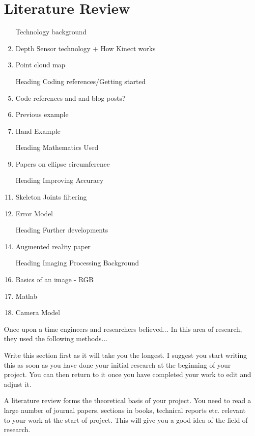 \chapter{Literature Review}

\begin{enumerate}
	\item [Technology background] 
	\item Depth Sensor technology + How Kinect works
	\item Point cloud map
	
	\item [Heading] Coding references/Getting started
	\item Code references and and blog posts? 
	\item Previous example
	\item Hand Example
	
	\item [Heading] Mathematics Used
	\item Papers on ellipse circumference
	
	\item [Heading] Improving Accuracy
	\item Skeleton Joints filtering
	\item Error Model
	
	\item [Heading] Further developments
	\item Augmented reality paper
	
	\item [Heading] Imaging Processing Background
	\item Basics of an image - RGB
	\item Matlab
	\item Camera Model
\end{enumerate}

Once upon a time engineers and researchers believed... In this area of research, they used the following methods... \cite{jct2010}

Write this section first as it will take you the longest. I suggest you start writing this as soon as you
have done your initial research at the beginning of your project. You can then return to it once you
have completed your work to edit and adjust it.

A literature review forms the theoretical basis of your project. You need to read a large number of
journal papers, sections in books, technical reports etc. relevant to your work at the start of project.
This will give you a good idea of the field of research.

